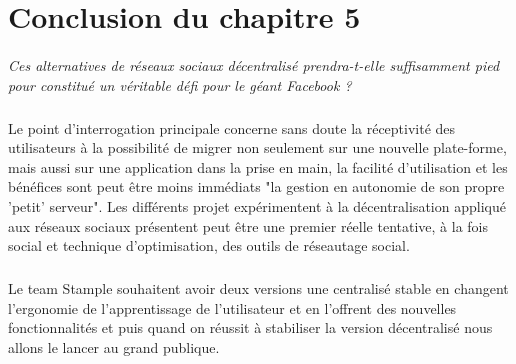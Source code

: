 \section{Conclusion du chapitre 5}
\paragraph{}
\textit{Ces alternatives de réseaux sociaux décentralisé prendra-t-elle suffisamment pied pour constitué un véritable défi pour le géant Facebook ?}
\subparagraph{}
Le point d'interrogation principale concerne sans doute la réceptivité des utilisateurs à la possibilité de migrer non seulement sur une nouvelle plate-forme, mais aussi sur une application dans la prise en main, la facilité d'utilisation et les bénéfices sont peut être moins immédiats "la gestion en autonomie de son propre 'petit' serveur".
Les différents projet expérimentent à la décentralisation appliqué aux réseaux sociaux présentent peut être une premier réelle tentative, à la fois social et technique d'optimisation, des outils de réseautage social.
\subparagraph{}
Le team Stample souhaitent avoir deux versions une centralisé stable en changent l'ergonomie de l'apprentissage de l'utilisateur et en l'offrent des nouvelles fonctionnalités et puis quand on réussit à stabiliser la version décentralisé nous allons le lancer au grand publique.  


